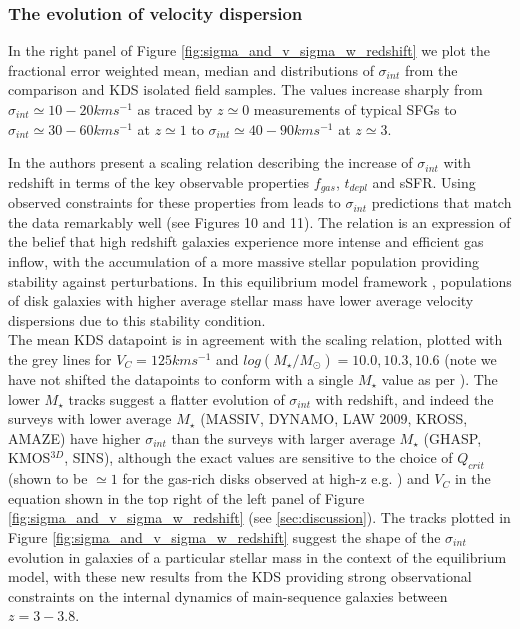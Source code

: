 \documentclass[fleqn,usenatbib]{mn2e}
\begin{document}
\subsubsection{The evolution of velocity dispersion}\label{subsubsec:sigma_evolution}

In the right panel of Figure \ref{fig:sigma_and_v_sigma_w_redshift} we plot the fractional error weighted mean, median and distributions of $\sigma_{int}$ from the comparison and KDS isolated field samples.
The values increase sharply from $\sigma_{int}\simeq10-20kms^{-1}$ as traced by $z\simeq0$ measurements of typical SFGs to $\sigma_{int}\simeq30-60kms^{-1}$ at $z\simeq1$ to $\sigma_{int}\simeq40-90kms^{-1}$ at $z\simeq3$.

In \cite{Wisnioski2015} the authors present a scaling relation describing the increase of $\sigma_{int}$ with redshift in terms of the key observable properties $f_{gas}$, $t_{depl}$ and sSFR.
Using observed constraints for these properties from \cite{Tacconi2013} leads to $\sigma_{int}$ predictions that match the data remarkably well (see \cite{Wisnioski2015} Figures 10 and 11).
The relation is an expression of the belief that high redshift galaxies experience more intense and efficient gas inflow, with the accumulation of a more massive stellar population providing stability against perturbations.
In this equilibrium model framework \citep[e.g.][]{Dave2012,Lilly2013,Saintonge2013}, populations of disk galaxies with higher average stellar mass have lower average velocity dispersions due to this stability condition.  \\

The mean KDS datapoint is in agreement with the scaling relation, plotted with the grey lines for $V_{C} = 125kms^{-1}$ and $log(M_{\star}/M_{\odot})=10.0,10.3,10.6$ (note we have not shifted the datapoints to conform with a single $M_{\star}$ value as per \cite{Wisnioski2015}).
The lower $M_{\star}$ tracks suggest a flatter evolution of $\sigma_{int}$ with redshift, and indeed the surveys with lower average $M_{\star}$ (MASSIV, DYNAMO, LAW 2009, KROSS, AMAZE) have higher $\sigma_{int}$ than the surveys with larger average $M_{\star}$ (GHASP, KMOS$^{3D}$, SINS), although the exact values are sensitive to the choice of $Q_{crit}$ (shown to be $\simeq1$ for the gas-rich disks observed at high-z e.g. \citealt{ForsterSchreiber2006,Genzel2011,Newman2013}) and $V_{C}$ in the equation shown in the top right of the left panel of Figure \ref{fig:sigma_and_v_sigma_w_redshift} (see \cref{sec:discussion}).
The tracks plotted in Figure \ref{fig:sigma_and_v_sigma_w_redshift} suggest the shape of the $\sigma_{int}$ evolution in galaxies of a particular stellar mass in the context of the equilibrium model, with these new results from the KDS providing strong observational constraints on the internal dynamics of main-sequence galaxies between $z=3-3.8$.
\end{document}
